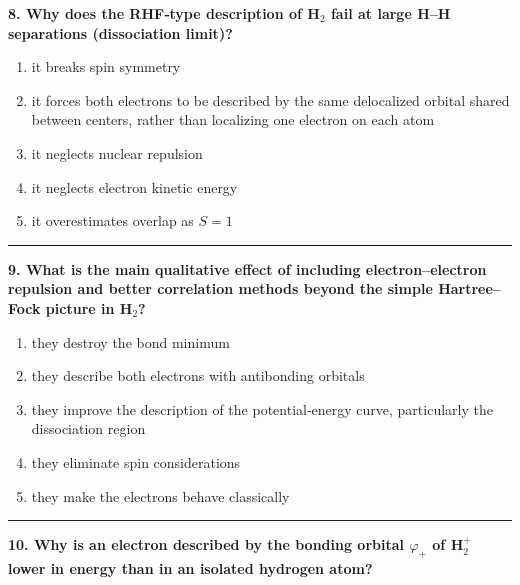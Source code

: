 \documentclass[
  english,
  9pt,
]{extbook}
\providecommand{\tightlist}{%
  \setlength{\itemsep}{0pt}\setlength{\parskip}{0pt}}
\theoremstyle{definition}
\theoremstyle{definition}
\theoremstyle{definition}
\theoremstyle{definition}
\theoremstyle{remark}
\begin{document}
\textbf{8. Why does the RHF‑type description of H\(_2\) fail at large H--H separations (dissociation limit)?}

\begin{enumerate}
\def\labelenumi{\alph{enumi}.}
\tightlist
\item
  it breaks spin symmetry\\
\item
  it forces both electrons to be described by the same delocalized orbital shared between centers, rather than localizing one electron on each atom\\
\item
  it neglects nuclear repulsion\\
\item
  it neglects electron kinetic energy\\
\item
  it overestimates overlap as \(S=1\)
\end{enumerate}

\begin{center}\rule{0.5\linewidth}{0.5pt}\end{center}

\textbf{9. What is the main qualitative effect of including electron--electron repulsion and better correlation methods beyond the simple Hartree--Fock picture in H\(_2\)?}

\begin{enumerate}
\def\labelenumi{\alph{enumi}.}
\tightlist
\item
  they destroy the bond minimum\\
\item
  they describe both electrons with antibonding orbitals\\
\item
  they improve the description of the potential‑energy curve, particularly the dissociation region\\
\item
  they eliminate spin considerations\\
\item
  they make the electrons behave classically
\end{enumerate}

\begin{center}\rule{0.5\linewidth}{0.5pt}\end{center}

\textbf{10. Why is an electron described by the bonding orbital \(\varphi_+\) of H\(_2^+\) lower in energy than in an isolated hydrogen atom?}
\end{document}
